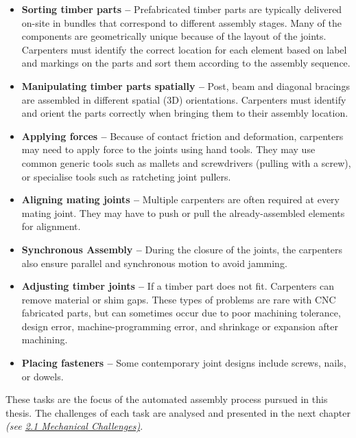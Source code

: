 \begin{itemize}
	\item \textbf{Sorting timber parts --} Prefabricated timber parts are typically delivered on-site in bundles that correspond to different assembly stages. Many of the components are geometrically unique because of the layout of the joints. Carpenters must identify the correct location for each element based on label and markings on the parts and sort them according to the assembly sequence.

	\item \textbf{Manipulating timber parts spatially --} Post, beam and diagonal bracings are assembled in different spatial (3D) orientations. Carpenters must identify and orient the parts correctly when bringing them to their assembly location.

	\item \textbf{Applying forces --} Because of contact friction and deformation, carpenters may need to apply force to the joints using hand tools. They may use common generic tools such as mallets and screwdrivers (pulling with a screw), or specialise tools such as ratcheting joint pullers. 

	\item \textbf{Aligning mating joints --} Multiple carpenters are often required at every mating joint. They may have to push or pull the already-assembled elements for alignment. 

	\item \textbf{Synchronous Assembly --} During the closure of the joints, the carpenters also ensure parallel and synchronous motion to avoid jamming.

	\item \textbf{Adjusting timber joints --} If a timber part does not fit. Carpenters can remove material or shim gaps. These types of problems are rare with CNC fabricated parts, but can sometimes occur due to poor machining tolerance, design error, machine-programming error, and shrinkage or expansion after machining.

	\item \textbf{Placing fasteners --} Some contemporary joint designs include screws, nails, or dowels.

\end{itemize}

These tasks are the focus of the automated assembly process pursued in this thesis. The challenges of each task are analysed and presented in the next chapter \textit{(see \ul{2.1 Mechanical Challenges)}}.

